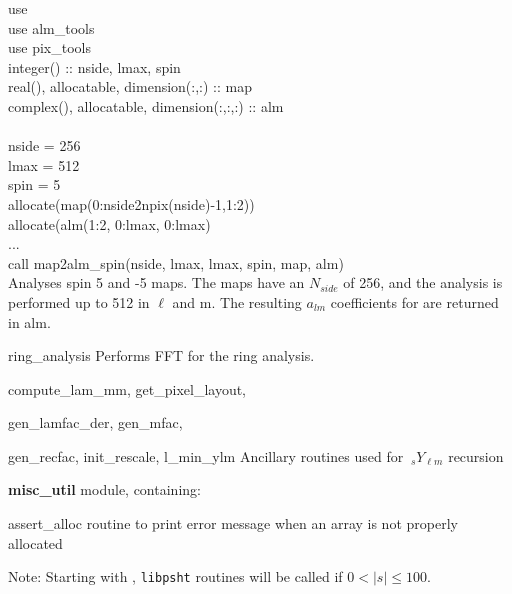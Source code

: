 \begin{example}
{
use \\
use alm\_tools\\
use pix\_tools\\
integer() :: nside, lmax, spin \\
real(), allocatable, dimension(:,:) :: map \\
complex(), allocatable, dimension(:,:,:) :: alm \\
\\
nside = 256 \\
lmax = 512 \\
spin = 5 \\
allocate(map(0:nside2npix(nside)-1,1:2)) \\
allocate(alm(1:2, 0:lmax, 0:lmax)\\
...\\
call map2alm\_spin(nside, lmax, lmax, spin, map, alm)  \\
}
{
Analyses spin 5 and -5 maps. The maps have
an $N_{side}$ of 256, and the analysis is performed up
to 512 in $\ell$ and m. The resulting $a_{lm}$ coefficients for
are returned in alm.
}
\end{example}

\begin{modules}
  \begin{sulist}{} %
  \item[ring\_analysis] Performs FFT for the ring analysis.
  \item[compute\_lam\_mm, get\_pixel\_layout, ]
  \item[gen\_lamfac\_der, gen\_mfac,  ] 
  \item[gen\_recfac, init\_rescale, l\_min\_ylm] Ancillary routines used
  for $\ {_s}Y_{\ell m}$ recursion
  \item[\textbf{misc\_util}] module, containing:
  \item[assert\_alloc] routine to print error message when an array is not
  properly allocated		
  \end{sulist}
Note: Starting with , {\tt libpsht} routines will be called if $0<|s|\le100$.
\end{modules}

